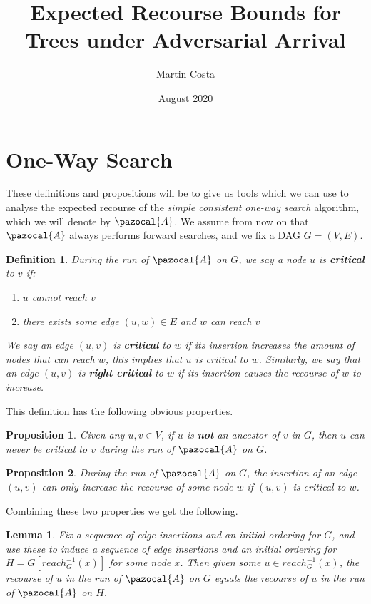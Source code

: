 \documentclass{article}
\title{Expected Recourse Bounds for Trees under Adversarial Arrival}
\author{Martin Costa}
\date{August 2020}
\newtheorem{lemma}{Lemma}
\newtheorem{proposition}{Proposition}
\newtheorem{definition}{Definition}
\begin{document}
\maketitle

\section{One-Way Search}

These definitions and propositions will be to give us tools which we can use to analyse the expected recourse of the \textit{simple consistent one-way search} algorithm, which we will denote by $\pazocal{A}$. We assume from now on that $\pazocal{A}$ always performs forward searches, and we fix a DAG $G=(V,E)$.

\begin{definition}
During the run of $\pazocal{A}$ on $G$, we say a node $u$ is \textbf{critical} to $v$ if:
\begin{enumerate}
    \item $u$ cannot reach $v$
    \item there exists some edge $(u,w) \in E$ and $w$ can reach $v$ 
\end{enumerate}
We say an edge $(u,v)$ is \textbf{critical} to $w$ if its insertion increases the amount of nodes that can reach $w$, this implies that $u$ is critical to $w$. Similarly, we say that an edge $(u,v)$ is \textbf{right critical} to $w$ if its insertion causes the recourse of $w$ to increase.
\end{definition}

This definition has the following obvious properties.

\begin{proposition}
Given any $u,v \in V$, if $u$ is \textbf{not} an ancestor of $v$ in $G$, then $u$ can never be critical to $v$ during the run of $\pazocal{A}$ on $G$. 
\end{proposition}

\begin{proposition}
During the run of $\pazocal{A}$ on $G$, the insertion of an edge $(u,v)$ can only increase the recourse of some node $w$ if $(u,v)$ is critical to $w$.
\end{proposition}

Combining these two properties we get the following.

\begin{lemma}
Fix a sequence of edge insertions and an initial ordering for $G$, and use these to induce a sequence of edge insertions and an initial ordering for $H = G[reach^{-1}_{G}(x)]$ for some node $x$. Then given some $u \in reach^{-1}_{G}(x)$, the recourse of $u$ in the run of $\pazocal{A}$ on $G$ equals the recourse of $u$ in the run of $\pazocal{A}$ on $H$.
\end{lemma}
\end{document}
